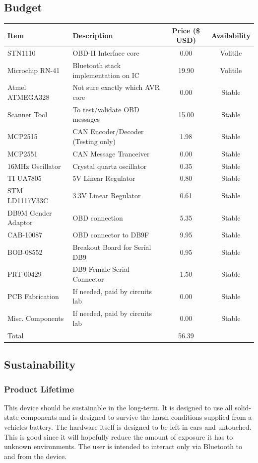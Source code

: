 \documentclass[12pt,letterpaper]{article}
\begin{document}
\subsection{Budget}
\begin{tabular}{| l | p{7cm} | c | c |}
\hline
Item & Description & Price (\$ USD) & Availability \\ \hline
STN1110 & OBD-II Interface core & 0.00& Volitile \\ \hline
Microchip RN-41 & Bluetooth stack implementation on IC & 19.90 & Volitile \\ \hline
Atmel ATMEGA328 & Not sure exactly which AVR core & 0.00 & Stable \\ \hline
Scanner Tool & To test/validate OBD messages & 15.00 & Stable\\ \hline
MCP2515 & CAN Encoder/Decoder (Testing only) & 1.98 & Stable\\ \hline
MCP2551 & CAN Message Tranceiver & 0.00 & Stable\\ \hline
16MHz Oscillator & Crystal quartz oscillator & 0.35 & Stable \\ \hline
TI UA7805 & 5V Linear Regulator & 0.80 & Stable \\ \hline
STM LD1117V33C & 3.3V Linear Regulator & 0.61 & Stable \\ \hline 
DB9M Gender Adaptor & OBD connection & 5.35 & Stable \\ \hline
CAB-10087 & OBD connector to DB9F & 9.95 & Stable \\ \hline
BOB-08552 & Breakout Board for Serial DB9 & 0.95 & Stable \\ \hline
PRT-00429 & DB9 Female Serial Connector & 1.50 & Stable \\ \hline
\hline
PCB Fabrication & If needed, paid by circuits lab & 0.00 & Stable\\ \hline
Misc. Components & If needed, paid by circuits lab & 0.00 & Stable\\ \hline
\hline
Total && 56.39 & \\ \hline
\end{tabular}

\subsection{Sustainability}
\subsubsection{Product Lifetime}
This device should be sustainable in the long-term. It is designed to use all solid-state components and is designed to survive the harsh conditions supplied from a vehicles battery. The hardware itself is designed to be left in cars and untouched. This is good since it will hopefully reduce the amount of exposure it has to unknown environments. The user is intended to interact only via Bluetooth to and from the device. 
\end{document}
